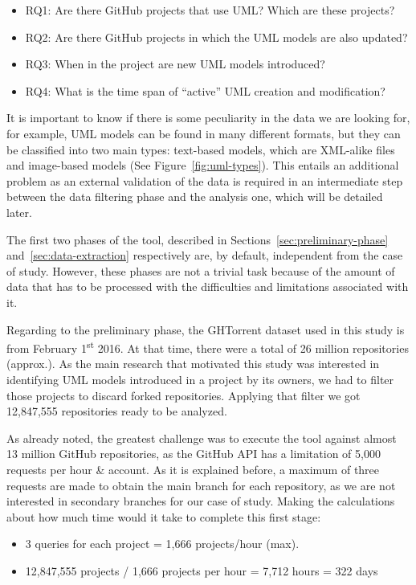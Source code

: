 \documentclass[a4paper, 12pt]{book}
\begin{document}
\begin{itemize}
  \item RQ1: Are there GitHub projects that use UML? Which are these projects?
  \item RQ2: Are there GitHub projects in which the UML models are also updated?
  \item RQ3: When in the project are new UML models introduced?
  \item RQ4: What is the time span of ``active'' UML creation and modification?
\end{itemize}

It is important to know if there is some peculiarity in the data we are looking for, for example, UML models can be
found in many different formats, but they can be classified into two main types: text-based models, which are XML-alike
files and image-based models (See Figure~\ref{fig:uml-types}). This entails an additional problem as an external validation of the data is
required in an intermediate step between the data filtering phase and the analysis one, which will be detailed later.

The first two phases of the tool, described in Sections~\ref{sec:preliminary-phase} and~\ref{sec:data-extraction} respectively
are, by default, independent from the case of study. However, these phases are not a trivial task because of the amount of
data that has to be processed with the difficulties and limitations associated with it.

Regarding to the preliminary phase, the GHTorrent dataset used in this study is from February 1\textsuperscript{st} 2016. At that time, there were
a total of 26 million repositories (approx.). As the main research that motivated this study was interested in identifying UML
models introduced in a project by its owners, we had to filter those projects to discard forked repositories. Applying that
filter we got 12,847,555 repositories ready to be analyzed.

As already noted, the greatest challenge was to execute the tool against almost 13 million GitHub repositories, as the GitHub API has a limitation
of 5,000 requests per hour \& account. As it is explained before, a maximum of three requests are made to obtain the main
branch for each repository, as we are not interested in secondary branches for our case of study. Making the calculations about
how much time would it take to complete this first stage:

\begin{itemize}
  \item 3 queries for each project = 1,666 projects/hour (max).
  \item 12,847,555 projects / 1,666 projects per hour = 7,712 hours = 322 days
\end{itemize}
\end{document}
